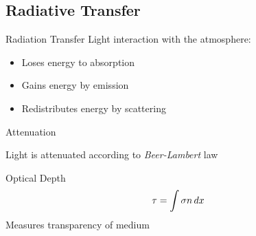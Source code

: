 \documentclass[compress,red,12pt]{beamer}
\begin{document}
\subsection{Radiative Transfer}

\begin{frame}{Radiation Transfer}
  Light interaction with the atmosphere:
  \begin{itemize}
  \item Loses energy to absorption
  \item Gains energy by emission
  \item Redistributes energy by scattering
  \end{itemize}
\end{frame}


% 
\begin{frame}{Attenuation}
  \begin{block}{Light is attenuated according to {\em Beer-Lambert} law}
    \centerline{\def\svgwidth{0.6\columnwidth}\small{}}
  \end{block}
  {
    \begin{block}{Optical Depth}    
      \begin{align*}
        \tau = \int \sigma n \,d{x}
      \end{align*}
      Measures transparency of medium
    \end{block}
  }
\end{frame}

\end{document}
